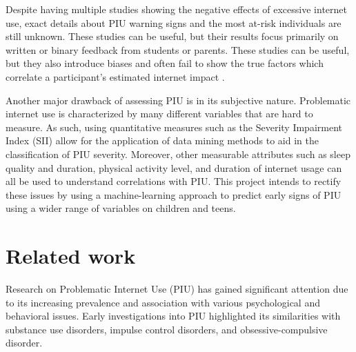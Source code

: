 \documentclass[11pt]{extarticle}
\begin{document}

    Despite having multiple studies showing the negative effects of excessive internet use, exact details about PIU warning signs and the most at-risk individuals are still unknown.
    These studies can be useful, but their results focus primarily on written or binary feedback from students or parents. 
    These studies can be useful, but they also introduce biases and often fail to show the true factors which correlate a participant's estimated internet impact \cite{Restrepo2020-pb,Aboujaoude2010-mc}.

    Another major drawback of assessing PIU is in its subjective nature. 
    Problematic internet use is characterized by many different variables that are hard to measure. 
    As such, using quantitative measures such as the Severity Impairment Index (SII) allow for the application of data mining methods to aid in the classification of PIU severity. 
    Moreover, other measurable attributes such as sleep quality and duration, physical activity level, and duration of internet usage can all be used to understand correlations with PIU.
    This project intends to rectify these issues by using a machine-learning approach to predict early signs of PIU using a wider range of variables on children and teens.

\section{Related work} 

    Research on Problematic Internet Use (PIU) has gained significant attention due to its increasing prevalence and association with various psychological and behavioral issues. Early investigations into PIU highlighted its similarities with substance use disorders, impulse control disorders, and obsessive-compulsive disorder.
    
\end{document}
